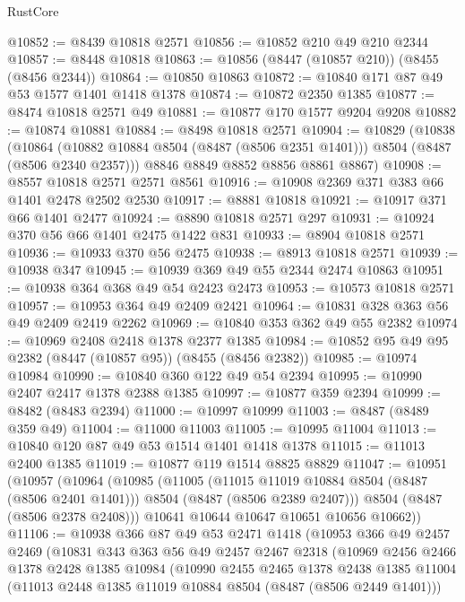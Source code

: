 \begin{lexlean}{RustCore}
\begin{coremodule}
@10852 := @8439 @10818 @2571
@10856 := @10852 @210 @49 @210 @2344
@10857 := @8448 @10818
@10863 := @10856 (@8447 (@10857 @210)) (@8455 (@8456 @2344))
@10864 := @10850 @10863
@10872 := @10840 @171 @87 @49 @53 @1577 @1401 @1418 @1378
@10874 := @10872 @2350 @1385
@10877 := @8474 @10818 @2571 @49
@10881 := @10877 @170 @1577 @9204 @9208
@10882 := @10874 @10881
@10884 := @8498 @10818 @2571
@10904 := @10829
    (@10838
      (@10864 (@10882 @10884 @8504 (@8487 (@8506 @2351 @1401))) @8504 (@8487 (@8506 @2340 @2357)))
      @8846
      @8849
      @8852
      @8856
      @8861
      @8867)
@10908 := @8557 @10818 @2571 @2571 @8561
@10916 := @10908 @2369 @371 @383 @66 @1401 @2478 @2502 @2530
@10917 := @8881 @10818
@10921 := @10917 @371 @66 @1401 @2477
@10924 := @8890 @10818 @2571 @297
@10931 := @10924 @370 @56 @66 @1401 @2475 @1422 @831
@10933 := @8904 @10818 @2571
@10936 := @10933 @370 @56 @2475
@10938 := @8913 @10818 @2571
@10939 := @10938 @347
@10945 := @10939 @369 @49 @55 @2344 @2474 @10863
@10951 := @10938 @364 @368 @49 @54 @2423 @2473
@10953 := @10573 @10818 @2571
@10957 := @10953 @364 @49 @2409 @2421
@10964 := @10831 @328 @363 @56 @49 @2409 @2419 @2262
@10969 := @10840 @353 @362 @49 @55 @2382
@10974 := @10969 @2408 @2418 @1378 @2377 @1385
@10984 := @10852 @95 @49 @95 @2382 (@8447 (@10857 @95)) (@8455 (@8456 @2382))
@10985 := @10974 @10984
@10990 := @10840 @360 @122 @49 @54 @2394
@10995 := @10990 @2407 @2417 @1378 @2388 @1385
@10997 := @10877 @359 @2394
@10999 := @8482 (@8483 @2394)
@11000 := @10997 @10999
@11003 := @8487 (@8489 @359 @49)
@11004 := @11000 @11003
@11005 := @10995 @11004
@11013 := @10840 @120 @87 @49 @53 @1514 @1401 @1418 @1378
@11015 := @11013 @2400 @1385
@11019 := @10877 @119 @1514 @8825 @8829
@11047 := @10951
    (@10957
      (@10964
        (@10985
          (@11005
            (@11015 @11019 @10884 @8504 (@8487 (@8506 @2401 @1401)))
            @8504
            (@8487 (@8506 @2389 @2407)))
          @8504
          (@8487 (@8506 @2378 @2408)))
        @10641
        @10644
        @10647
        @10651
        @10656
        @10662))
@11106 := @10938
    @366
    @87
    @49
    @53
    @2471
    @1418
    (@10953
      @366
      @49
      @2457
      @2469
      (@10831
        @343
        @363
        @56
        @49
        @2457
        @2467
        @2318
        (@10969
          @2456
          @2466
          @1378
          @2428
          @1385
          @10984
          (@10990
            @2455
            @2465
            @1378
            @2438
            @1385
            @11004
            (@11013 @2448 @1385 @11019 @10884 @8504 (@8487 (@8506 @2449 @1401)))

\end{coremodule}
\end{lexlean}
